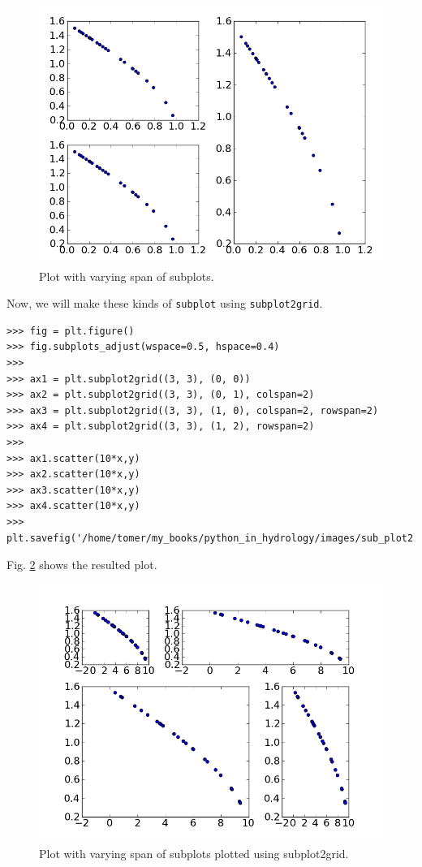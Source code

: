 \documentclass[10pt]{book}
\begin{document}
\beforefig
\begin{figure}[h!]
  \centering
    \includegraphics[scale=0.5]{images/sub_plot1.png}
  \caption{Plot with varying span of subplots.}
   \label{fig:subplot1}
\end{figure}
\afterfig

Now, we will make these kinds of \verb"subplot" using \verb"subplot2grid". 
\beforeverb \begin{verbatim}
>>> fig = plt.figure()
>>> fig.subplots_adjust(wspace=0.5, hspace=0.4)
>>> 
>>> ax1 = plt.subplot2grid((3, 3), (0, 0))
>>> ax2 = plt.subplot2grid((3, 3), (0, 1), colspan=2)
>>> ax3 = plt.subplot2grid((3, 3), (1, 0), colspan=2, rowspan=2)
>>> ax4 = plt.subplot2grid((3, 3), (1, 2), rowspan=2)
>>> 
>>> ax1.scatter(10*x,y)
>>> ax2.scatter(10*x,y)
>>> ax3.scatter(10*x,y)
>>> ax4.scatter(10*x,y)
>>> plt.savefig('/home/tomer/my_books/python_in_hydrology/images/sub_plot2.png')
\end{verbatim} \afterverb
Fig. \ref{fig:subplot2} shows the resulted plot.

\beforefig
\begin{figure}[h!]
  \centering
    \includegraphics[scale=0.5]{images/sub_plot2.png}
  \caption{Plot with varying span of subplots plotted using subplot2grid.}
   \label{fig:subplot2}
\end{figure}
\afterfig
\end{document}
